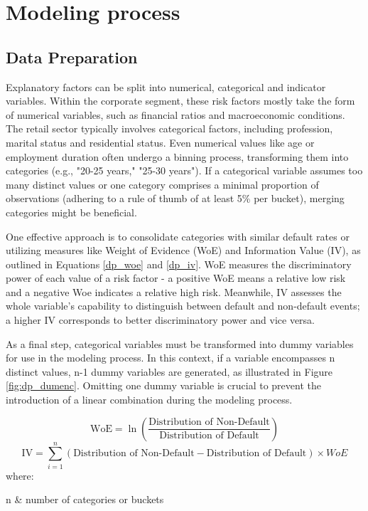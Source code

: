 \chapter{Modeling process}

\section{Data Preparation}
\label{sec:dataprep}
Explanatory factors can be split into numerical, categorical and indicator variables. Within the corporate segment, these risk factors mostly take the form of numerical variables, such as financial ratios and macroeconomic conditions. The retail sector typically involves categorical factors, including profession, marital status and residential status. Even numerical values like age or employment duration often undergo a binning process, transforming them into categories (e.g., "20-25 years," "25-30 years"). If a categorical variable assumes too many distinct values or one category comprises a minimal proportion of observations (adhering to a rule of thumb of at least 5\% per bucket), merging categories might be beneficial.

One effective approach is to consolidate categories with similar default rates or utilizing measures like Weight of Evidence (WoE) and Information Value (IV), as outlined in Equations \ref{dp_woe} and \ref{dp_iv}. WoE measures the discriminatory power of each value of a risk factor - a positive WoE means a relative low risk and a negative Woe indicates a relative high risk. Meanwhile, IV assesses the whole variable's capability to distinguish between default and non-default events; a higher IV corresponds to better discriminatory power and vice versa.

As a final step, categorical variables must be transformed into dummy variables for use in the modeling process. In this context, if a variable encompasses n distinct values, n-1 dummy variables are generated, as illustrated in Figure \ref{fig:dp_dumenc}. Omitting one dummy variable is crucial to prevent the introduction of a linear combination during the modeling process. \cite[pp.~47-51]{Witzany:2017}

\begin{equation}
\text{WoE} = \ln\left(\frac{\text{Distribution of Non-Default}}{\text{Distribution of Default}}\right) \label{dp_woe}
\end{equation}
\begin{equation}
\text{IV} = \sum_{i=1}^{n} (\text{Distribution of Non-Default} - \text{Distribution of Default}) \times WoE \label{dp_iv}
\end{equation}
where:
\begin{conditions}
n  	& number of categories or buckets 
\end{conditions}

